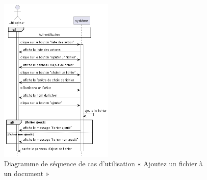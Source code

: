 \begin{figure}[H]
  \centering
  \includegraphics[width=0.5\textwidth]{out/diagrams/documents/add_file/add_file}
  \caption{Diagramme de séquence de cas d'utilisation « Ajoutez un fichier à un document  »}
  \label{fig:sequence_add_file}
\end{figure}
